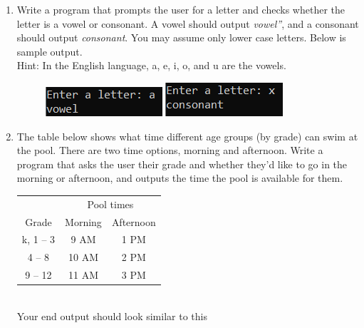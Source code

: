 \documentclass{article}
\newcommand{\csq}[1]{\reflectbox{''}#1''}  %
\begin{document}
\begin{enumerate}
	\item 
		Write a program that prompts the user for a letter and checks whether the letter is a vowel 
		or consonant.  A vowel should output \textit{\csq{vowel}}, and a consonant should output 
		\textit{consonant}.  You may assume only lower case letters. Below is sample output.\\
		Hint: In the English language, a, e, i, o, and u are the vowels.
	
		\begin{figure}[h]
		\centering
			\begin{minipage}{.5\textwidth}
			\centering
				\includegraphics[scale=1.2]{./imgs/vowelYesAlt.png}
			\end{minipage}%
			\begin{minipage}{.5\textwidth}
			\centering
				\includegraphics[scale=1.1]{./imgs/vowelNoAlt.png}
			\end{minipage}
		\end{figure}



	\item 
		The table below shows what time different age groups (by grade) can swim at the pool.  There 
		are two time options, morning and afternoon.  Write a program that asks the user their grade 
		and whether they'd like to go in the morning or afternoon, and outputs the time the pool is 
		available for them.

		\begin{minipage}{.45\textwidth}
		\begin{tabular}{c|cc}
						& \multicolumn{2}{c}{Pool times}\\
			Grade 		& Morning 	& Afternoon \\ \hline
			k, 1 -- 3 	& 9 AM 		& 1 PM\\
			4 -- 8 		& 10 AM 	& 2 PM\\
			9 -- 12 	& 11 AM 	& 3 PM \\
		\end{tabular}
		\end{minipage}
		\begin{minipage}{.45\textwidth}
			\ \\
			Your end output should look similar to this


\end{minipage}
\end{enumerate}
\end{document}
